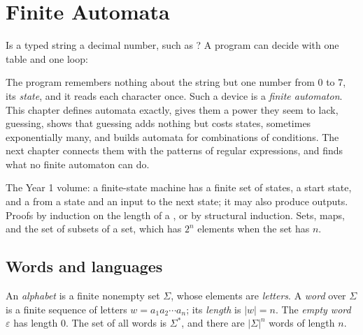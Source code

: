 \chapter{Finite Automata}\label{ch:b2:finite-automata}

Is a typed string a decimal number, such as ? A program can decide with one table and one loop:

\label{lst:b2:finite-automata:hook}

\label{out:b2:finite-automata:hook}

The program remembers nothing about the string but one number from 0 to 7, its \emph{state}, and it reads each
character once. Such a device is a \emph{finite automaton}. This chapter defines automata exactly, gives them a
power they seem to lack, guessing, shows that guessing adds nothing but costs states, sometimes exponentially many,
and builds automata for combinations of conditions. The next chapter connects them with the patterns of regular
expressions, and finds what no finite automaton can do.

\begin{recall}
The Year 1 volume: a finite-state machine has a finite set of states, a start state, and a  from a
state and an input to the next state; it may also produce outputs. Proofs by induction on the length of a , or by
structural induction. Sets, maps, and the set of subsets of a set, which has $2^n$ elements when the set has $n$.
\end{recall}

\section{Words and languages}\label{sec:b2:finite-automata:words}

\begin{definition}\label{def:b2:finite-automata:word}
An \emph{alphabet} is a finite nonempty set $\Sigma$, whose elements are \emph{letters}. A
\emph{word} over $\Sigma$ is a finite sequence of letters $w = a_1 a_2 \cdots a_n$; its
\emph{length} is $|w| = n$. The \emph{empty word} $\varepsilon$ has length 0. The set of all words
is $\Sigma^*$, and there are $|\Sigma|^n$ words of length $n$.
\end{definition}

